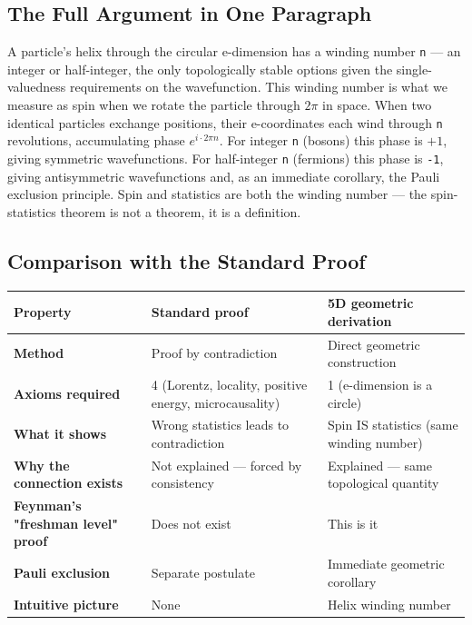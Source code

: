 \documentclass[aps,prd,preprint,superscriptaddress,longbibliography,floatfix]{revtex4-2}
\theoremstyle{remark}
\begin{document}
\subsection{The Full Argument in One Paragraph}

A particle's helix through the circular e-dimension has a winding number \texttt{n} --- an integer or half-integer, the only topologically stable options given the single-valuedness requirements on the wavefunction. This winding number is what we measure as spin when we rotate the particle through $2\pi$ in space. When two identical particles exchange positions, their e-coordinates each wind through \texttt{n} revolutions, accumulating phase $e^{i\cdot2\pi n}$. For integer \texttt{n} (bosons) this phase is $+1$, giving symmetric wavefunctions. For half-integer \texttt{n} (fermions) this phase is \texttt{-1}, giving antisymmetric wavefunctions and, as an immediate corollary, the Pauli exclusion principle. Spin and statistics are both the winding number --- the spin-statistics theorem is not a theorem, it is a definition.



\subsection{Comparison with the Standard Proof}


\begin{table}[H]
\begin{ruledtabular}
\begin{tabular}{p{5.0cm}p{5.0cm}p{5.0cm}}
Property & Standard proof \cite{Pauli1940} & 5D geometric derivation \\
\hline
\textbf{Method} & Proof by contradiction & Direct geometric construction \\
\textbf{Axioms required} & 4 (Lorentz, locality, positive energy, microcausality) & 1 (e-dimension is a circle) \\
\textbf{What it shows} & Wrong statistics leads to contradiction & Spin IS statistics (same winding number) \\
\textbf{Why the connection exists} & Not explained --- forced by consistency & Explained --- same topological quantity \\
\textbf{Feynman's "freshman level" proof} & Does not exist & This is it \\
\textbf{Pauli exclusion} & Separate postulate & Immediate geometric corollary \\
\textbf{Intuitive picture} & None & Helix winding number \\
\end{tabular}
\end{ruledtabular}
\end{table}
\end{document}
